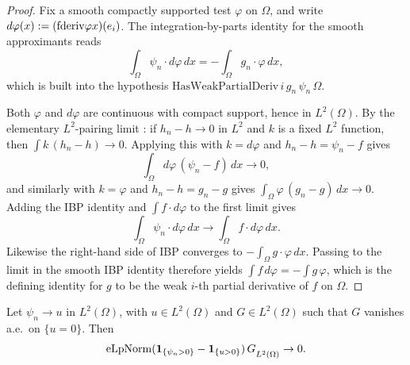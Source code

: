 \begin{proof}
\leanok

Fix a smooth compactly supported test $\varphi$ on $\Omega$, and write
$d\varphi(x) := (\mathrm{fderiv}{\varphi}{x})(e_i)$. The integration-by-parts identity for the
smooth approximants reads
\begin{equation*}
  \int_{\Omega} \psi_n \cdot d\varphi\,dx
    = -\int_{\Omega} g_n \cdot \varphi\,dx,
\end{equation*}
which is built into the hypothesis $\mathrm{HasWeakPartialDeriv}\,i\,g_n\,\psi_n\,\Omega$.

Both $\varphi$ and $d\varphi$ are continuous with compact support, hence in
$L^2(\Omega)$. By the elementary $L^2$-pairing limit
: if
$h_n - h \to 0$ in $L^2$ and $k$ is a fixed $L^2$ function, then
$\int k\,(h_n - h) \to 0$. Applying this with $k = d\varphi$ and
$h_n - h = \psi_n - f$ gives
\begin{equation*}
  \int_{\Omega} d\varphi\,(\psi_n - f)\,dx \to 0,
\end{equation*}
and similarly with $k = \varphi$ and $h_n - h = g_n - g$ gives
$\int_{\Omega} \varphi\,(g_n - g)\,dx \to 0$. Adding the IBP identity and
$\int f\cdot d\varphi$ to the first limit gives
\begin{equation*}
  \int_{\Omega} \psi_n\cdot d\varphi\,dx \to \int_{\Omega} f \cdot d\varphi\,dx.
\end{equation*}
Likewise the right-hand side of IBP converges to $-\int_{\Omega} g\cdot\varphi\,dx$.
Passing to the limit in the smooth IBP identity therefore yields
$\int f\,d\varphi = -\int g\,\varphi$, which is the defining identity for $g$
to be the weak $i$-th partial derivative of $f$ on $\Omega$.
\end{proof}

\begin{theorem}
\label{thm:tendsto_eLpNorm_indicator_diff_mul_of_tendsto_eLpNorm}
\leanok
Let $\psi_n \to u$ in $L^2(\Omega)$, with $u \in L^2(\Omega)$ and $G \in
L^2(\Omega)$ such that $G$ vanishes a.e.\ on $\{u = 0\}$. Then
\begin{equation*}
\mathrm{eLpNorm}{(\mathbf{1}_{\{\psi_n > 0\}} - \mathbf{1}_{\{u > 0\}})\,G}_{L^2(\Omega)}
\to 0.
\end{equation*}
\end{theorem}

